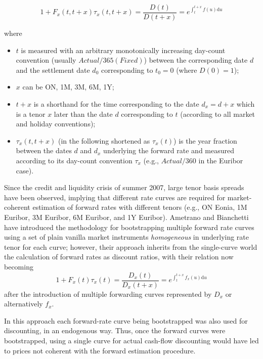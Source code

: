 \documentclass{article}
\begin{document}
\begin{equation}
1+F_x(t, t+x) \tau_x(t, t+x) = \frac{D(t)}{D(t+x)} = e^{\int_t^{t+x} f(u)\mathrm{d}u}
\end{equation}

where
\begin{itemize}
    \item $t$ is measured with an arbitrary monotonically increasing day-count convention (usually $Actual/365(Fixed)$) between the corresponding date $d$ and the settlement date $d_0$ corresponding to $t_0=0$ (where $D(0)=1$);
    \item $x$ can be ON, 1M, 3M, 6M, 1Y;
    \item $t+x$ is a shorthand for the time corresponding to the date $d_x=d+x$ which is a tenor $x$ later than the date $d$ corresponding to $t$ (according to all market and holiday conventions);
    \item $\tau_x(t, t+x)$ (in the following shortened as $\tau_x(t)$) is the year fraction between the dates $d$ and $d_x$ underlying the forward rate and measured according to its day-count convention $\tau_x$ (e.g., $Actual/360$ in the Euribor case).
\end{itemize}

Since the credit and liquidity crisis of summer 2007, large tenor basis spreads have been observed, implying that different rate curves are required for market-coherent estimation of forward rates with different tenors (e.g., ON Eonia, 1M Euribor, 3M Euribor, 6M Euribor, and 1Y Euribor). Ametrano and Bianchetti \cite{ametrano-bianchetti-1} have introduced the methodology for bootstrapping multiple forward rate curves using a set of plain vanilla market instruments \textit{homogeneous} in underlying rate tenor for each curve; however, their approach inherits from the single-curve world the calculation of forward rates as discount ratios, with their relation now becoming
\begin{equation}
\label{eq:ForwardAsPseudoDiscountRatio}
1+F_x(t) \tau_x(t) = \frac{D_x(t)}{D_x(t+x)} = e^{\int_t^{t+x} f_x(u) \mathrm{d}u}
\end{equation}
after the introduction of multiple forwarding curves represented by $D_x$ or alternatively $f_x$.

In this approach each forward-rate curve being bootstrapped was also used for discounting, in an endogenous way. Thus, once the forward curves were bootstrapped, using a single curve for actual cash-flow discounting would have led to prices not coherent with the forward estimation procedure.
\end{document}
